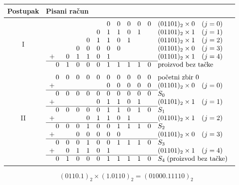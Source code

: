 \documentclass[a4paper,11pt]{article}
\numberwithin{equation}{section}
\renewcommand{\arraystretch}{1.25}
\newcommand{\redlinija}{\arrayrulecolor{black!28}\specialrule{0.3pt}{2pt}{2pt}\arrayrulecolor{black}}
\begin{document}
\par\addvspace{\medskipamount}\noindent\begin{minipage}{\linewidth}
\centering\captionsetup{type=table}
\caption{Množenje neoznačenih brojeva: $(0110.1)_{2}\times (1.0110)_{2}$.}\label{tab:postupak-10}
\begingroup\small\setlength{\arraycolsep}{2pt}\renewcommand{\arraystretch}{1.02}
\begin{tabular}{@{}cl@{}}\toprule
Postupak & Pisani račun\\\midrule
I & $\begin{array}[t]{r@{\,}*{10}{c}@{\quad}l}
 &  &  &  &  &  & 0 & 0 & 0 & 0 & 0 & (01101)_2\times 0\quad(j=0) \\
 &  &  &  &  & 0 & 1 & 1 & 0 & 1 &  & (01101)_2\times 1\quad(j=1) \\
 &  &  &  & 0 & 1 & 1 & 0 & 1 &  &  & (01101)_2\times 1\quad(j=2) \\
 &  &  & 0 & 0 & 0 & 0 & 0 &  &  &  & (01101)_2\times 0\quad(j=3) \\
+ &  & 0 & 1 & 1 & 0 & 1 &  &  &  &  & (01101)_2\times 1\quad(j=4) \\
\cline{1-11}
 & 0 & 1 & 0 & 0 & 0 & 1 & 1 & 1 & 1 & 0 & \text{proizvod bez tačke} \\
\end{array}$\quad\\[5pt]
\redlinija
II & $\begin{array}[t]{r@{\,}*{10}{c}@{\quad}l}
 & 0 & 0 & 0 & 0 & 0 & 0 & 0 & 0 & 0 & 0 & \text{početni zbir }0 \\
+ &  &  &  &  &  & 0 & 0 & 0 & 0 & 0 & (01101)_2\times 0\quad(j=0) \\
\cline{1-11}
 & 0 & 0 & 0 & 0 & 0 & 0 & 0 & 0 & 0 & 0 & S_0 \\
+ &  &  &  &  & 0 & 1 & 1 & 0 & 1 &  & (01101)_2\times 1\quad(j=1) \\
\cline{1-11}
 & 0 & 0 & 0 & 0 & 0 & 1 & 1 & 0 & 1 & 0 & S_1 \\
+ &  &  &  & 0 & 1 & 1 & 0 & 1 &  &  & (01101)_2\times 1\quad(j=2) \\
\cline{1-11}
 & 0 & 0 & 0 & 1 & 0 & 0 & 1 & 1 & 1 & 0 & S_2 \\
+ &  &  & 0 & 0 & 0 & 0 & 0 &  &  &  & (01101)_2\times 0\quad(j=3) \\
\cline{1-11}
 & 0 & 0 & 0 & 1 & 0 & 0 & 1 & 1 & 1 & 0 & S_3 \\
+ &  & 0 & 1 & 1 & 0 & 1 &  &  &  &  & (01101)_2\times 1\quad(j=4) \\
\cline{1-11}
 & 0 & 1 & 0 & 0 & 0 & 1 & 1 & 1 & 1 & 0 & S_4\;\text{(proizvod bez tačke)} \\
\end{array}$\quad\\[5pt]
\bottomrule\end{tabular}\endgroup
\begin{equation}\label{eq:racun-3}
(0110.1)_{2}\times (1.0110)_{2}=(01000.11110)_{2}
\end{equation}
\end{minipage}
\end{document}
